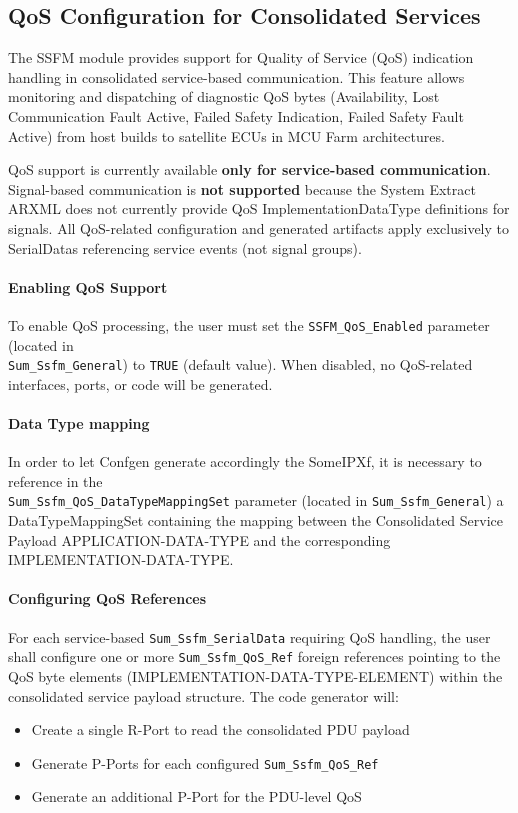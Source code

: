 \subsection{QoS Configuration for Consolidated Services}
\label{subsec:qosconfig}

The SSFM module provides support for Quality of Service (QoS) indication handling in consolidated service-based communication. This feature allows monitoring and dispatching of diagnostic QoS bytes (Availability, Lost Communication Fault Active, Failed Safety Indication, Failed Safety Fault Active) from host builds to satellite ECUs in MCU Farm architectures.

QoS support is currently available \textbf{only for service-based communication}. Signal-based communication is \textbf{not supported} because the System Extract ARXML does not currently provide QoS ImplementationDataType definitions for signals. All QoS-related configuration and generated artifacts apply exclusively to SerialDatas referencing service events (not signal groups).

\paragraph{Enabling QoS Support}
To enable QoS processing, the user must set the \texttt{SSFM\_QoS\_Enabled} parameter (located in \\ \texttt{Sum\_Ssfm\_General}) to \texttt{TRUE} (default value). When disabled, no QoS-related interfaces, ports, or code will be generated.

\paragraph{Data Type mapping}
In order to let Confgen generate accordingly the SomeIPXf, it is necessary to reference in the \\ \texttt{Sum\_Ssfm\_QoS\_DataTypeMappingSet} parameter (located in \texttt{Sum\_Ssfm\_General}) a DataTypeMappingSet containing the mapping between 
the Consolidated Service Payload APPLICATION-DATA-TYPE and the corresponding IMPLEMENTATION-DATA-TYPE.

\paragraph{Configuring QoS References}
For each service-based \texttt{Sum\_Ssfm\_SerialData} requiring QoS handling, the user shall configure one or more \texttt{Sum\_Ssfm\_QoS\_Ref} foreign references pointing to the QoS byte elements (IMPLEMENTATION-DATA-TYPE-ELEMENT) within the consolidated service payload structure. 
The code generator will:
\begin{itemize}
    \item Create a single R-Port to read the consolidated PDU payload
    \item Generate P-Ports for each configured \texttt{Sum\_Ssfm\_QoS\_Ref} 
    \item Generate an additional P-Port for the PDU-level QoS
\end{itemize}

